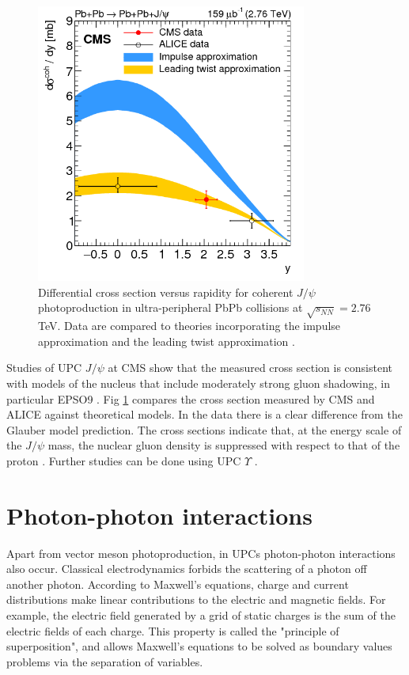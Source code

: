 \begin{figure}[h!]
\begin{centering}
\includegraphics[width=3.5in]{Chapter2/importfigs/patkenny_Figure_002.png}
\par\end{centering}
\caption{Differential cross section versus rapidity for coherent $J/\psi$ photoproduction in ultra-peripheral PbPb collisions at $\sqrt{s_{NN}}=2.76$ TeV. Data are compared to theories incorporating the impulse approximation and the leading twist approximation \cite{Khachatryan:2016qhq}. \label{fig:pk3}}
\end{figure}

Studies of UPC $J/\psi$ at CMS show that the measured cross section is consistent with models of the nucleus that include moderately strong gluon shadowing, in particular EPSO9 \cite{lta2013.05,Eskola:2009uj}. Fig \ref{fig:pk3} compares the cross section measured by CMS and ALICE against theoretical models. In the data there is a clear difference from the Glauber model prediction. The cross sections indicate that, at the energy scale of the $J/\psi$ mass, the nuclear gluon density is suppressed with respect to that of the proton \cite{Frankfurt:2011cs}. Further studies can be done using UPC $\Upsilon$ \cite{pQCD2013.02,Cisek:2012yt}. 

\section{Photon-photon interactions}

Apart from vector meson photoproduction, in UPCs photon-photon interactions also occur. Classical electrodynamics forbids the scattering of a photon off another photon. According to Maxwell's equations, charge and current distributions make linear contributions to the electric and magnetic fields. For example, the electric field generated by a grid of static charges is the sum of the electric fields of each charge. This property is called the "principle of superposition", and allows Maxwell's equations to be solved as boundary values problems via the separation of variables.

